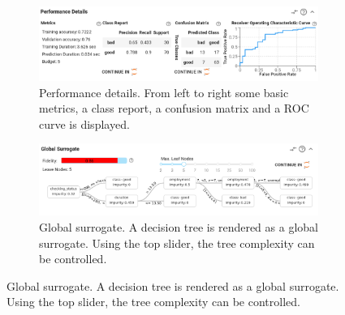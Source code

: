 \begin{figure}[htbp]
    \centering
    
    \begin{subfigure}[t]{0.48\textwidth}
        \centering
        \includegraphics[width=\textwidth]{images/XAutoML a.png}
        \caption{Performance details. From left to right some basic metrics, a class report, a confusion matrix and a ROC curve is displayed.}
        \label{fig:performance_details}
    \end{subfigure}
    \hfill
    \begin{subfigure}[t]{0.48\textwidth}
        \centering
        \includegraphics[width=\textwidth]{images/XAutoML b.png}
        \caption{Global surrogate. A decision tree is rendered as a global surrogate. Using the top slider, the tree complexity can be controlled.}
        \label{fig:global_surrogate}
    \end{subfigure}
    
    \vspace{0.5cm}
    

\end{figure}
